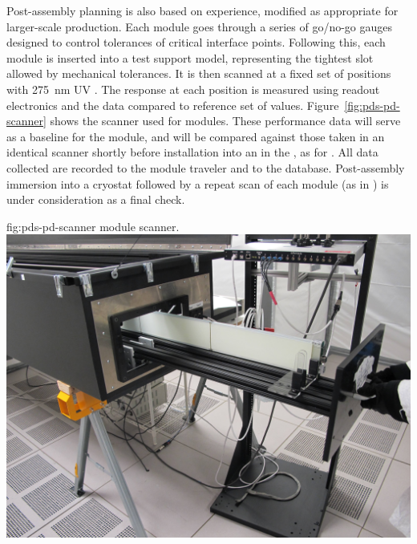 Post-assembly  planning is also based on  experience, modified as appropriate for larger-scale production.  Each  module goes through a series of go/no-go gauges 
designed to control tolerances of critical interface points.  Following this, each module is inserted into a test  support model, representing the tightest slot allowed by  mechanical tolerances.
It is then scanned at a fixed set of positions with \SI{275}{nm} UV .  
The  response at each position is measured using  readout electronics and the data compared to reference set of values.
Figure~\ref{fig:pds-pd-scanner} shows %
the scanner used for  modules. These performance data will serve as a baseline for the  module, and will be compared against those taken in an identical scanner shortly before installation into an  in the , as for . %
All data collected are recorded to the module traveler and to the   database.
Post-assembly immersion into a  cryostat followed by a repeat scan of each  module (as in ) is under consideration as a final  check.

\begin{dunefigure}{fig:pds-pd-scanner}
{ module scanner.}
  \includegraphics[width=0.5\columnwidth]{graphics/pds-pd-scanner.jpg}
\end{dunefigure}


